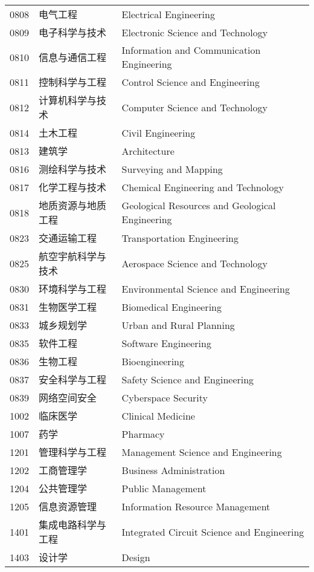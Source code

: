 {\begin{longtable}{lll}
0808 & 电气工程 & Electrical Engineering \\
0809 & 电子科学与技术 & Electronic Science and Technology \\
0810 & 信息与通信工程 & Information and Communication Engineering \\
0811 & 控制科学与工程 & Control Science and Engineering \\
0812 & 计算机科学与技术 & Computer Science and Technology \\
0814 & 土木工程 & Civil Engineering \\
0813 & 建筑学 & Architecture \\
0816 & 测绘科学与技术 & Surveying and Mapping \\
0817 & 化学工程与技术 & Chemical Engineering and Technology \\
0818 & 地质资源与地质工程 & Geological Resources and Geological Engineering \\
0823 & 交通运输工程 & Transportation Engineering \\
0825 & 航空宇航科学与技术 & Aerospace Science and Technology \\
0830 & 环境科学与工程 & Environmental Science and Engineering \\
0831 & 生物医学工程 & Biomedical Engineering \\
0833 & 城乡规划学 & Urban and Rural Planning \\
0835 & 软件工程 & Software Engineering \\
0836 & 生物工程 & Bioengineering \\
0837 & 安全科学与工程 & Safety Science and Engineering \\
0839 & 网络空间安全 & Cyberspace Security \\
1002 & 临床医学 & Clinical Medicine \\
1007 & 药学 & Pharmacy \\
1201 & 管理科学与工程 & Management Science and Engineering \\
1202 & 工商管理学 & Business Administration \\
1204 & 公共管理学 & Public Management \\
1205 & 信息资源管理 & Information Resource Management \\
1401 & 集成电路科学与工程 & Integrated Circuit Science and Engineering \\
1403 & 设计学 & Design \\
\end{longtable}
}%